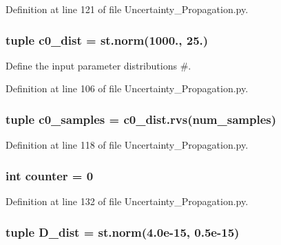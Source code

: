 Definition at line 121 of file Uncertainty\-\_\-\-Propagation.\-py.

\hypertarget{namespace_uncertainty___propagation_a18b5ccb1547d2ff074b16380e64cac39}{
\subsubsection[{c0\-\_\-dist}]{\setlength{\rightskip}{0pt plus 5cm}tuple c0\-\_\-dist = st.\-norm(1000., 25.)}}\label{namespace_uncertainty___propagation_a18b5ccb1547d2ff074b16380e64cac39}


Define the input parameter distributions \#. 



Definition at line 106 of file Uncertainty\-\_\-\-Propagation.\-py.

\hypertarget{namespace_uncertainty___propagation_ae2539890c28b90e3780f315d426c1ba6}{
\subsubsection[{c0\-\_\-samples}]{\setlength{\rightskip}{0pt plus 5cm}tuple c0\-\_\-samples = c0\-\_\-dist.\-rvs({\bf num\-\_\-samples})}}\label{namespace_uncertainty___propagation_ae2539890c28b90e3780f315d426c1ba6}


Definition at line 118 of file Uncertainty\-\_\-\-Propagation.\-py.

\hypertarget{namespace_uncertainty___propagation_a617a47c70795bcff659815ad0efd2266}{
\subsubsection[{counter}]{\setlength{\rightskip}{0pt plus 5cm}int counter = 0}}\label{namespace_uncertainty___propagation_a617a47c70795bcff659815ad0efd2266}


Definition at line 132 of file Uncertainty\-\_\-\-Propagation.\-py.

\hypertarget{namespace_uncertainty___propagation_a5896454d88496c6554718f56476236d0}{
\subsubsection[{D\-\_\-dist}]{\setlength{\rightskip}{0pt plus 5cm}tuple D\-\_\-dist = st.\-norm(4.\-0e-\/15, 0.\-5e-\/15)}}\label{namespace_uncertainty___propagation_a5896454d88496c6554718f56476236d0}


